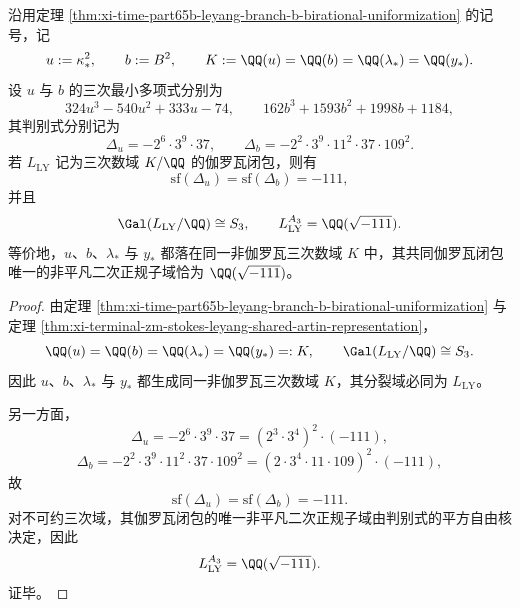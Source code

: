 \begin{theorem}\label{thm:xi-time-part65b-leyang-common-s3-closure}
沿用定理 \ref{thm:xi-time-part65b-leyang-branch-b-birational-uniformization} 的记号，记
\[
u:=\kappa_*^2,
\qquad
b:=B^2,
\qquad
K:=\QQ(u)=\QQ(b)=\QQ(\lambda_*)=\QQ(y_*).
\]
设 \(u\) 与 \(b\) 的三次最小多项式分别为
\[
324u^3-540u^2+333u-74,
\qquad
162b^3+1593b^2+1998b+1184,
\]
其判别式分别记为
\[
\Delta_u=-2^6\cdot 3^9\cdot 37,
\qquad
\Delta_b=-2^2\cdot 3^9\cdot 11^2\cdot 37\cdot 109^2.
\]
若 \(L_{\mathrm{LY}}\) 记为三次数域 \(K/\QQ\) 的伽罗瓦闭包，则有
\[
\mathrm{sf}(\Delta_u)=\mathrm{sf}(\Delta_b)=-111,
\]
并且
\[
\Gal(L_{\mathrm{LY}}/\QQ)\cong S_3,
\qquad
L_{\mathrm{LY}}^{A_3}=\QQ(\sqrt{-111}).
\]
等价地，\(u\)、\(b\)、\(\lambda_*\) 与 \(y_*\) 都落在同一非伽罗瓦三次数域 \(K\) 中，其共同伽罗瓦闭包唯一的非平凡二次正规子域恰为 \(\QQ(\sqrt{-111})\)。
\end{theorem}
\begin{proof}
由定理 \ref{thm:xi-time-part65b-leyang-branch-b-birational-uniformization} 与定理 \ref{thm:xi-terminal-zm-stokes-leyang-shared-artin-representation}，
\[
\QQ(u)=\QQ(b)=\QQ(\lambda_*)=\QQ(y_*)=:K,
\qquad
\Gal(L_{\mathrm{LY}}/\QQ)\cong S_3.
\]
因此 \(u\)、\(b\)、\(\lambda_*\) 与 \(y_*\) 都生成同一非伽罗瓦三次数域 \(K\)，其分裂域必同为 \(L_{\mathrm{LY}}\)。

另一方面，
\[
\Delta_u
=
-2^6\cdot 3^9\cdot 37
=
(2^3\cdot 3^4)^2\cdot (-111),
\]
\[
\Delta_b
=
-2^2\cdot 3^9\cdot 11^2\cdot 37\cdot 109^2
=
(2\cdot 3^4\cdot 11\cdot 109)^2\cdot (-111),
\]
故
\[
\mathrm{sf}(\Delta_u)=\mathrm{sf}(\Delta_b)=-111.
\]
对不可约三次域，其伽罗瓦闭包的唯一非平凡二次正规子域由判别式的平方自由核决定，因此
\[
L_{\mathrm{LY}}^{A_3}=\QQ(\sqrt{-111}).
\]
证毕。
\end{proof}

